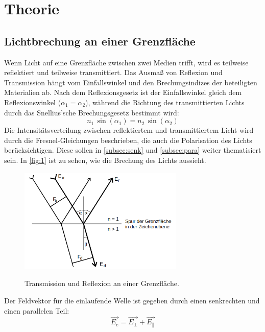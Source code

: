 \section{Theorie}
\label{sec:Theorie}

\subsection{Lichtbrechung an einer Grenzfläche}
Wenn Licht auf eine Grenzfläche zwischen zwei Medien trifft, wird es teilweise
reflektiert und teilweise transmittiert. Das Ausmaß von Reflexion und
Transmission hängt vom Einfallswinkel und den Brechungsindizes der beteiligten
Materialien ab. Nach dem Reflexionsgesetz ist der Einfallswinkel gleich dem
Reflexionswinkel ($\alpha_1 = \alpha_2$), während die Richtung des transmittierten
Lichts durch das Snellius'sche Brechungsgesetz bestimmt wird: 
\begin{equation}
    \label{eqn:1}
    n_1 \, \sin(\alpha_1) = n_2 \, \sin(\alpha_2)
\end{equation}
\noindent Die Intensitätsverteilung zwischen 
reflektiertem und transmittiertem Licht wird durch die Fresnel-Gleichungen
beschrieben, die auch die Polarisation des Lichts berücksichtigen. Diese 
sollen in \autoref{subsec:senk} und \autoref{subsec:para} weiter thematisiert 
sein. In \autoref{fig:1} ist zu sehen, wie die Brechung des Lichts aussieht.
\begin{figure}[H]
    \caption{Transmission und Reflexion an einer Grenzfläche.\cite{anleitung8}}
    \centering
    \includegraphics[width=0.7\textwidth]{"Bilder/brechung.png"}
    \label{fig:1}
\end{figure}
\noindent Der Feldvektor für die einlaufende Welle ist gegeben durch einen 
senkrechten und einen parallelen Teil:
\begin{equation}
    \label{eqn:2}
    \vec{E_e} = \vec{E_{\perp}} + \vec{E_{\parallel}}
\end{equation}
